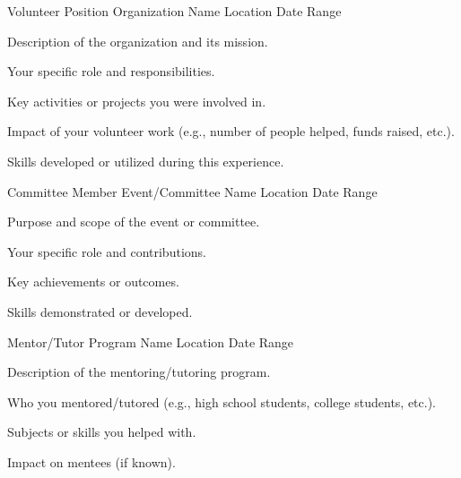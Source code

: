 
\begin{cventries}
    \cventry
    {Volunteer Position} %
    {Organization Name} %
    {Location} %
    {Date Range} %
    {
      \begin{cvitems} %
        \item {Description of the organization and its mission.}
        \item {Your specific role and responsibilities.}
        \item {Key activities or projects you were involved in.}
        \item {Impact of your volunteer work (e.g., number of people helped, funds raised, etc.).}
        \item {Skills developed or utilized during this experience.}
      \end{cvitems}
    }

    \cventry
    {Committee Member} %
    {Event/Committee Name} %
    {Location} %
    {Date Range} %
    {
      \begin{cvitems} %
        \item {Purpose and scope of the event or committee.}
        \item {Your specific role and contributions.}
        \item {Key achievements or outcomes.}
        \item {Skills demonstrated or developed.}
      \end{cvitems}
    }

    \cventry
    {Mentor/Tutor} %
    {Program Name} %
    {Location} %
    {Date Range} %
    {
      \begin{cvitems} %
        \item {Description of the mentoring/tutoring program.}
        \item {Who you mentored/tutored (e.g., high school students, college students, etc.).}
        \item {Subjects or skills you helped with.}
        \item {Impact on mentees (if known).}
      \end{cvitems}
    }


\end{cventries}
